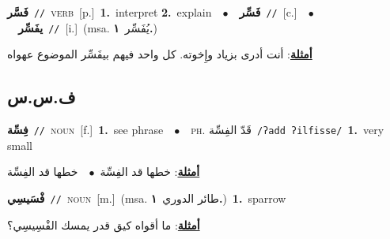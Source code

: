 \documentclass[10pt,a4paper,twoside]{article} %
\begin{document}
\begin{multicols}{2}
{\setlength\topsep{0pt}\textbf{\foreignlanguage{arabic}{فَسَّر}}\ {\color{gray}\texttt{//}\color{black}}\ \textsc{verb}\ [p.]\ \textbf{1.}~interpret  \textbf{2.}~explain\ \ $\bullet$\ \ \setlength\topsep{0pt}\textbf{\foreignlanguage{arabic}{فَسِّر}}\ {\color{gray}\texttt{//}\color{black}}\ [c.]\ \ $\bullet$\ \ \setlength\topsep{0pt}\textbf{\foreignlanguage{arabic}{يفَسِّر}}\ {\color{gray}\texttt{//}\color{black}}\ [i.]\ \color{gray}(msa. \foreignlanguage{arabic}{يُفَسِّر}~\foreignlanguage{arabic}{\textbf{١.}})\color{black}\  \begin{flushright}\color{gray}\foreignlanguage{arabic}{\textbf{\underline{\foreignlanguage{arabic}{أمثلة}}}: أنت أدرى بزياد وإِخوته. كل واحد فيهم بيفَسِّر الموضوع عهواه}\end{flushright}\color{black}} \vspace{2mm}

\vspace{-3mm}
\subsection*{\color{blue}\foreignlanguage{arabic}{ف.س.س}\color{blue}{}} 

{\setlength\topsep{0pt}\textbf{\foreignlanguage{arabic}{فِسِّة}}\ {\color{gray}\texttt{//}\color{black}}\ \textsc{noun}\ [f.]\ \textbf{1.}~see phrase\ \ $\bullet$\ \ \textsc{ph.} \color{gray} \foreignlanguage{arabic}{قَدّ الفِسِّة}\color{black}\ {\color{gray}\texttt{/{\sffamily ʔadd ʔilfisse}/}\color{black}}\ \textbf{1.}~very small\  \begin{flushright}\color{gray}\foreignlanguage{arabic}{\textbf{\underline{\foreignlanguage{arabic}{أمثلة}}}: خطها قد الفِسِّة\ $\bullet$\ \  خطها قد الفِسِّة}\end{flushright}\color{black}} \vspace{2mm}

{\setlength\topsep{0pt}\textbf{\foreignlanguage{arabic}{فْسَيسِي}}\ {\color{gray}\texttt{//}\color{black}}\ \textsc{noun}\ [m.]\ \color{gray}(msa. \foreignlanguage{arabic}{طائر الدوري}~\foreignlanguage{arabic}{\textbf{١.}})\color{black}\ \textbf{1.}~sparrow\  \begin{flushright}\color{gray}\foreignlanguage{arabic}{\textbf{\underline{\foreignlanguage{arabic}{أمثلة}}}: ما أقواه كيق قدر يمسك الفْسِيسِي؟}\end{flushright}\color{black}} \vspace{2mm}


\end{multicols}
\end{document}
